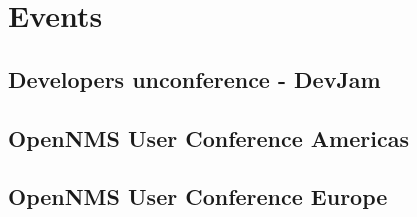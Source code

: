 \section{Events}
\subsection{Developers unconference - DevJam}
\subsection{OpenNMS User Conference Americas}
\subsection{OpenNMS User Conference Europe}